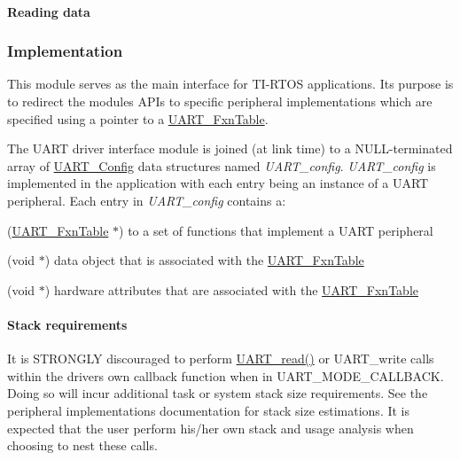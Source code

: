 \paragraph*{Reading data}




\subsubsection*{Implementation}

This module serves as the main interface for T\+I-\/\+R\+T\+O\+S applications. Its purpose is to redirect the module\textquotesingle{}s A\+P\+Is to specific peripheral implementations which are specified using a pointer to a \hyperlink{struct_u_a_r_t___fxn_table}{U\+A\+R\+T\+\_\+\+Fxn\+Table}.

The U\+A\+R\+T driver interface module is joined (at link time) to a N\+U\+L\+L-\/terminated array of \hyperlink{struct_u_a_r_t___config}{U\+A\+R\+T\+\_\+\+Config} data structures named {\itshape U\+A\+R\+T\+\_\+config}. {\itshape U\+A\+R\+T\+\_\+config} is implemented in the application with each entry being an instance of a U\+A\+R\+T peripheral. Each entry in {\itshape U\+A\+R\+T\+\_\+config} contains a\+:
\begin{DoxyItemize}
\item (\hyperlink{struct_u_a_r_t___fxn_table}{U\+A\+R\+T\+\_\+\+Fxn\+Table} $\ast$) to a set of functions that implement a U\+A\+R\+T peripheral
\item (void $\ast$) data object that is associated with the \hyperlink{struct_u_a_r_t___fxn_table}{U\+A\+R\+T\+\_\+\+Fxn\+Table}
\item (void $\ast$) hardware attributes that are associated with the \hyperlink{struct_u_a_r_t___fxn_table}{U\+A\+R\+T\+\_\+\+Fxn\+Table}
\end{DoxyItemize}

\paragraph*{Stack requirements}

It is S\+T\+R\+O\+N\+G\+L\+Y discouraged to perform \hyperlink{_u_a_r_t_8h_a023152d57539cad94bdd813956013e73}{U\+A\+R\+T\+\_\+read()} or U\+A\+R\+T\+\_\+write calls within the driver\textquotesingle{}s own callback function when in U\+A\+R\+T\+\_\+\+M\+O\+D\+E\+\_\+\+C\+A\+L\+L\+B\+A\+C\+K. Doing so will incur additional task or system stack size requirements. See the peripheral implementations\textquotesingle{} documentation for stack size estimations. It is expected that the user perform his/her own stack and usage analysis when choosing to nest these calls.

